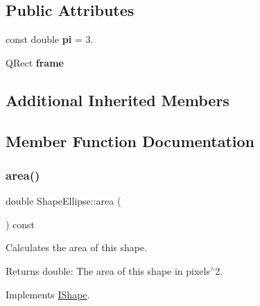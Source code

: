 \subsection*{Public Attributes}
\begin{DoxyCompactItemize}
\item 
\mbox{\label{class_shape_ellipse_a8ee638d167c341015a7f0f82b7a8debb}} 
const double {\bfseries pi} = 3.
\item 
\mbox{\label{class_shape_ellipse_ac9feb0571e6f658866ab142643230081}} 
Q\+Rect {\bfseries frame}
\end{DoxyCompactItemize}
\subsection*{Additional Inherited Members}


\subsection{Member Function Documentation}
\mbox{\label{class_shape_ellipse_a08287b301b7501eb941805eaf85fc00c}} 
\subsubsection{\texorpdfstring{area()}{area()}}
{\footnotesize\ttfamily double Shape\+Ellipse\+::area (\begin{DoxyParamCaption}{ }\end{DoxyParamCaption}) const\hspace{0.3cm}{\ttfamily [virtual]}}



Calculates the area of this shape. 

\begin{DoxyReturn}{Returns}
double\+: The area of this shape in pixels$^\wedge$2. 
\end{DoxyReturn}


Implements \mbox{\hyperlink{class_i_shape_aed742a160acdd13c9cfdeb16e605afea}{I\+Shape}}.

\mbox{\label{class_shape_ellipse_ac7f0a33cb5a88c6956f2d876c0c5d313}} 
